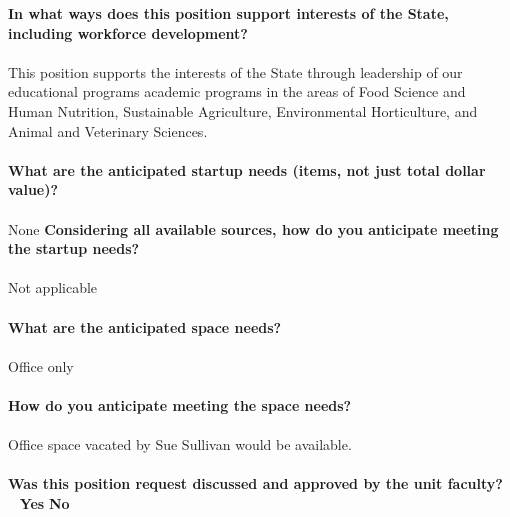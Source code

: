 \documentclass[11pt]{article}
\begin{document}
\vfill
\noindent\textbf{\rmfamily In what ways does this position support interests of the State, including workforce development?}\\~\\
This position supports the interests of the State through leadership of our educational programs academic programs in the areas of Food Science and Human Nutrition, Sustainable Agriculture, Environmental Horticulture, and Animal and Veterinary Sciences.
\\~\\
\vfill
\newpage\noindent\textbf{\rmfamily What are the anticipated startup needs (items, not just total dollar value)?}\\~\\
None
\vfill
\noindent\textbf{\rmfamily Considering all available sources, how do you anticipate meeting the startup needs?}\\~\\
Not applicable\\~\\
\vfill
\noindent\textbf{\rmfamily What are the anticipated space needs?}\\~\\ Office only\\~\\
\vfill
\noindent\textbf{\rmfamily How do you anticipate meeting the space needs?} \\~\\
Office space vacated by Sue Sullivan would be available.\\~\\
\vfill
\noindent\textbf{\rmfamily Was this position request discussed and approved by the unit faculty?} \hfill ~ \hfill \textbf{\Large{\CrossedBox} \normalsize{Yes}} \hfill \textbf{\Large{\HollowBox} \normalsize{ No}}\\~\\%
\end{document}
